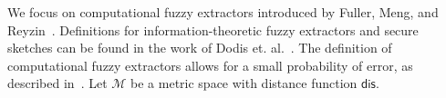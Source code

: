 \documentclass[11pt]{article}
\newcommand{\class}[1]{{\ensuremath{\mathsf{#1}}}}
\newcommand{\gen}{\ensuremath{\class{Gen}}\xspace}
\newcommand{\rep}{\ensuremath{\class{Rep}}\xspace}
\newcommand{\sketch}{\ensuremath{\class{SS}}\xspace}
\newcommand{\rec}{\ensuremath{\class{Rec}}\xspace}
\newcommand{\dis}{\ensuremath{\mathsf{dis}}}
\newtheorem{definition}[theorem]{Definition}
\begin{document}
We focus on computational fuzzy extractors introduced by Fuller, Meng, and Reyzin~\cite{fuller2013computational}.  Definitions for information-theoretic fuzzy extractors and secure sketches can be found in the work of Dodis et. al.~\cite[Sections 2.5--4.1]{DBLP:journals/siamcomp/DodisORS08}.  The definition of computational fuzzy extractors allows for a small probability of error, as described in~\cite[Sections 8]{DBLP:journals/siamcomp/DodisORS08}.  Let $\mathcal{M}$ be a metric space with distance function $\dis$.  

%
\end{document}
